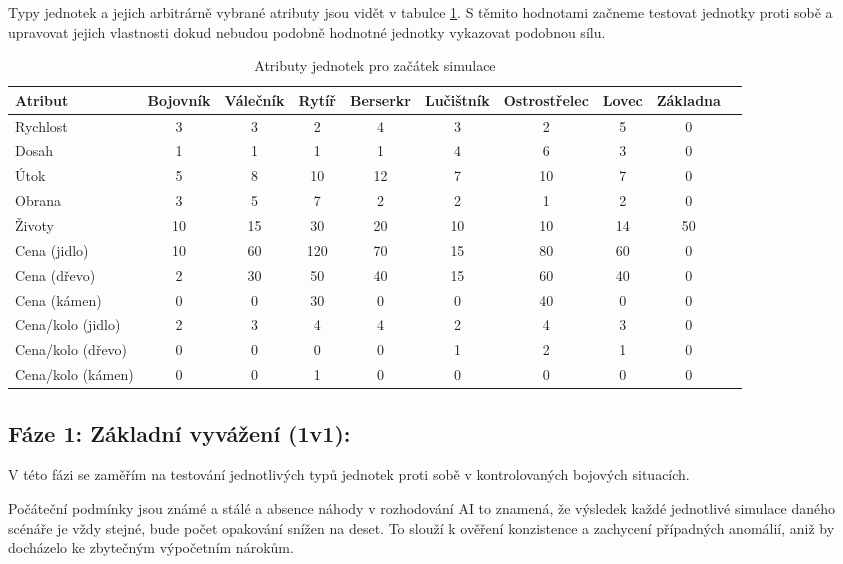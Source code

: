 
Typy jednotek a jejich arbitrárně vybrané atributy jsou vidět v tabulce \ref{tab:atributy_jednotek_otocena}. S těmito hodnotami začneme testovat jednotky proti sobě a upravovat jejich vlastnosti dokud nebudou podobně hodnotné jednotky vykazovat podobnou sílu.

\newpage

\begin{table}
\centering
\begin{tabular}{|l|*{9}{c|}}
\hline
\textbf{Atribut} & \textbf{Bojovník} & \textbf{Válečník} & \textbf{Rytíř} & \textbf{Berserkr} & \textbf{Lučištník} & \textbf{Ostrostřelec} & \textbf{Lovec} & \textbf{Základna} \\
\hline
Rychlost & 3 & 3 & 2 & 4 & 3 & 2 & 5 & 0 \\
\hline
Dosah & 1 & 1 & 1 & 1 & 4 & 6 & 3 & 0 \\
\hline
Útok & 5 & 8 & 10 & 12 & 7 & 10 & 7 & 0 \\
\hline
Obrana & 3 & 5 & 7 & 2 & 2 & 1 & 2 & 0 \\
\hline
Životy & 10 & 15 & 30 & 20 & 10 & 10 & 14 & 50 \\
\hline
Cena (jidlo) & 10 & 60 & 120 & 70 & 15 & 80 & 60 & 0 \\
\hline
Cena (dřevo) & 2 & 30 & 50 & 40 & 15 & 60 & 40 & 0\\
\hline
Cena (kámen) & 0 & 0 & 30 & 0 & 0 & 40 & 0 & 0 \\
\hline
Cena/kolo (jidlo) & 2 & 3 & 4 & 4 & 2 & 4 & 3 & 0 \\
\hline
Cena/kolo (dřevo) & 0 & 0 & 0 & 0 & 1 & 2 & 1 & 0 \\
\hline
Cena/kolo (kámen) & 0 & 0 & 1 & 0 & 0 & 0 & 0 & 0 \\
\hline
\end{tabular}
\caption{Atributy jednotek pro začátek simulace}
\label{tab:atributy_jednotek_otocena}
\end{table}

\newpage


\subsection{Fáze 1: Základní vyvážení (1v1):}

V této fázi se zaměřím na testování jednotlivých typů jednotek proti sobě v kontrolovaných bojových situacích. 

Počáteční podmínky jsou známé a stálé a absence náhody v rozhodování AI to znamená, že výsledek každé jednotlivé simulace daného scénáře je vždy stejné, bude počet opakování snížen na deset. To slouží k ověření konzistence a zachycení případných anomálií, aniž by docházelo ke zbytečným výpočetním nárokům.

